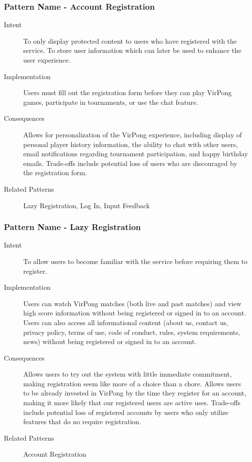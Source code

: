 		\subsubsection{Pattern Name - Account Registration}
			\begin{description}
				\item[Intent] To only display protected content to users who have registered with the service. To store user information which can later be used to enhance the user experience.
				\item[Implementation] Users must fill out the registration form before they can play VirPong games, participate in tournaments, or use the chat feature.
				\item[Consequences] Allows for personalization of the VirPong experience, including display of personal player history information, the ability to chat with other users, email notifications regarding tournament participation, and happy birthday emails. Trade-offs include potential loss of users who are discouraged by the registration form.
				\item[Related Patterns] Lazy Registration, Log In, Input Feedback
			\end{description}
			
		\subsubsection{Pattern Name - Lazy Registration}
			\begin{description}
				\item[Intent] To allow users to become familiar with the service before requiring them to register.
				\item[Implementation] Users can watch VirPong matches (both live and past matches) and view high score information without being registered or signed in to an account. Users can also access all informational content (about us, contact us, privacy policy, terms of use, code of conduct, rules, system requirements, news) without being registered or signed in to an account.
				\item[Consequences] Allows users to try out the system with little immediate commitment, making registration seem like more of a choice than a chore. Allows users to be already invested in VirPong by the time they register for an account, making it more likely that our registered users are active uses. Trade-offs include potential loss of registered accounts by users who only utilize features that do no require registration.
				\item[Related Patterns] Account Registration
			\end{description}
			
